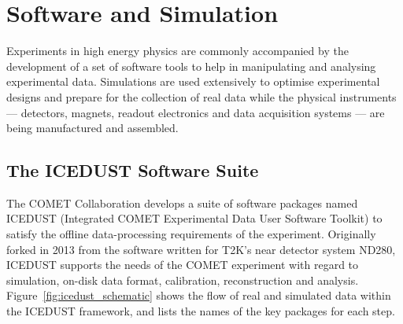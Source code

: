 \chapter{Software and Simulation}
\label{ch:software}

\newcommand{\SimG}{\texttt{SimG4}\xspace}
\newcommand{\oaEvent}{\texttt{oaEvent}\xspace}
\newcommand{\Geant}{{\sc Geant4}\xspace}


 
    
    
    



Experiments in high energy physics are commonly accompanied by the development
of a set of software tools to help in manipulating and analysing experimental
data. Simulations are used extensively to optimise experimental designs and
prepare for the collection of real data while the physical instruments ---
detectors, magnets, readout electronics and data acquisition systems --- are
being manufactured and assembled.

\section{The ICEDUST Software Suite}
The COMET Collaboration develops a suite of software packages named ICEDUST
(Integrated COMET Experimental Data User Software Toolkit) to satisfy the
offline data-processing requirements of the experiment. Originally forked in
2013 from the software written for T2K's near detector system ND280, ICEDUST
supports the needs of the COMET experiment with regard to simulation, on-disk
data format, calibration, reconstruction and analysis.
Figure~\ref{fig:icedust_schematic} shows the flow of real and simulated data
within the ICEDUST framework, and lists the names of the key packages for each
step.


